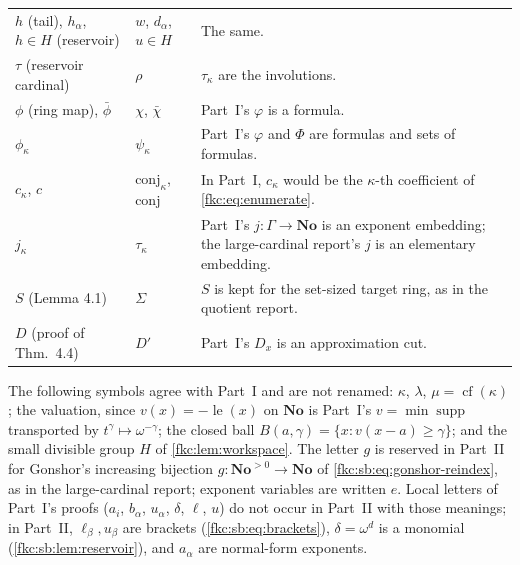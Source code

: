 \documentclass[11pt,letterpaper]{article}
\numberwithin{equation}{section}
\theoremstyle{definition}
\theoremstyle{remark}
\newcommand{\No}{\mathbf{No}}
\newcommand{\supp}{\operatorname{supp}}
\newcommand{\cf}{\operatorname{cf}}
\newcommand{\lead}{\operatorname{le}}
\newcommand{\conj}{\mathrm{conj}}
\begin{document}
\begin{center}
\begin{longtable}{@{}>{\raggedright\arraybackslash}p{}>{\raggedright\arraybackslash}p{}>{\raggedright\arraybackslash}p{}@{}}
$h$ (tail), $h_\alpha$, $h\in H$ (reservoir) & $w$, $d_\alpha$, $u\in H$ & The same. \\
$\tau$ (reservoir cardinal) & $\rho$ & $\tau_\kappa$ are the involutions. \\
$\phi$ (ring map), $\bar\phi$ & $\chi$, $\bar\chi$ & Part~I's $\varphi$ is a formula. \\
$\phi_\kappa$ & $\psi_\kappa$ & Part~I's $\varphi$ and $\Phi$ are formulas and sets of formulas. \\
$c_\kappa$, $c$ & $\conj_\kappa$, $\conj$ & In Part~I, $c_\kappa$ would be the $\kappa$-th coefficient of \eqref{fkc:eq:enumerate}. \\
$j_\kappa$ & $\tau_\kappa$ & Part~I's $j:\Gamma\to\No$ is an exponent embedding; the large-cardinal report's $j$ is an elementary embedding. \\
$S$ (Lemma 4.1) & $\Sigma$ & $S$ is kept for the set-sized target ring, as in the quotient report. \\
$D$ (proof of Thm.~4.4) & $D'$ & Part~I's $D_x$ is an approximation cut. \\
\bottomrule
\end{longtable}
\end{center}

The following symbols agree with Part~I and are not renamed: $\kappa$, $\lambda$, $\mu=\cf(\kappa)$; the valuation, since $v(x)=-\lead(x)$ on $\No$ is Part~I's $v=\min\supp$ transported by $t^\gamma\mapsto\omega^{-\gamma}$; the closed ball $B(a,\gamma)=\{x:v(x-a)\ge\gamma\}$; and the small divisible group $H$ of \cref{fkc:lem:workspace}. The letter $g$ is reserved in Part~II for Gonshor's increasing bijection $g:\No^{>0}\to\No$ of \eqref{fkc:sb:eq:gonshor-reindex}, as in the large-cardinal report; exponent variables are written $e$. Local letters of Part~I's proofs ($a_i$, $b_\alpha$, $u_\alpha$, $\delta$, $\ell$, $u$) do not occur in Part~II with those meanings; in Part~II, $\ell_\beta,u_\beta$ are brackets (\eqref{fkc:sb:eq:brackets}), $\delta=\omega^d$ is a monomial (\cref{fkc:sb:lem:reservoir}), and $a_\alpha$ are normal-form exponents.
\end{document}
